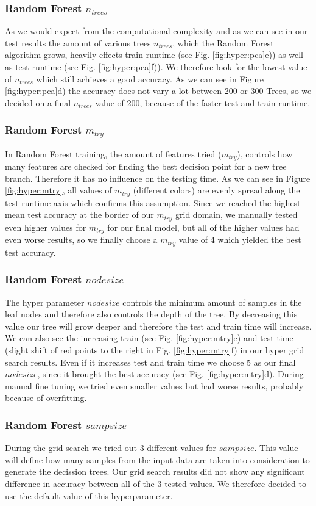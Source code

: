 \documentclass[conference]{IEEEtran}
\begin{document}
{\subsubsection{Random Forest $n_{trees}$}
As we would expect from the computational complexity and as we can see in our test results the amount of various trees $n_{trees}$, which the Random Forest algorithm grows, heavily effects train runtime (see Fig. \ref{fig:hyper:pca}e)) as well as test runtime (see Fig. \ref{fig:hyper:pca}f)). We therefore look for the lowest value of $n_{trees}$ which still achieves a good accuracy. As we can see in Figure \ref{fig:hyper:pca}d) the accuracy does not vary a lot between 200 or 300 Trees, so we decided on a final $n_{trees}$ value of 200, because of the faster test and train runtime.
\subsubsection{Random Forest $m_{try}$}
In Random Forest training, the amount of features tried ($m_{try}$), controls how many features are checked for finding the best decision point for a new tree branch. Therefore it has no influence on the testing time. As we can see in Figure \ref{fig:hyper:mtry}, all values of $m_{try}$ (different colors) are evenly spread along the test runtime axis which confirms this assumption. Since we reached the highest mean test accuracy at the border of our $m_{try}$ grid domain, we manually tested even higher values for $m_{try}$ for our final model, but all of the higher values had even worse results, so we finally choose a $m_{try}$ value of 4 which yielded the best test accuracy.
\subsubsection{Random Forest ${nodesize}$}
The hyper parameter ${nodesize}$ controls the minimum amount of samples in the leaf nodes and therefore also controls the depth of the tree. By decreasing this value our tree will grow deeper and therefore the test and train time will increase. We can also see the increasing train (see Fig. \ref{fig:hyper:mtry}e) and test time (slight shift of red points to the right in Fig. \ref{fig:hyper:mtry}f) in our hyper grid search results. Even if it increases test and train time we choose 5 as our final ${nodesize}$, since it brought the best accuracy (see Fig. \ref{fig:hyper:mtry}d). During manual fine tuning we tried even smaller values but had worse results, probably because of overfitting.
\subsubsection{Random Forest ${sampsize}$}
During the grid search we tried out 3 different values for ${sampsize}$. This value will define how many samples from the input data are taken into consideration to generate the decission trees. Our grid search results did not show any significant difference in accuracy between all of the 3 tested values. We therefore decided to use the default value of this hyperparameter.
}
\end{document}

